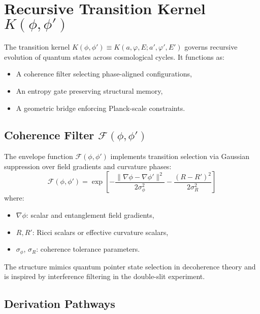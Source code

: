 \section{Recursive Transition Kernel \( K(\phi,\phi') \)}
\label{sec:kernel}

The transition kernel \( K(\phi,\phi') \equiv K(a,\varphi,E; a',\varphi',E') \) governs recursive evolution of quantum states across cosmological cycles. It functions as:
\begin{itemize}
    \item A coherence filter selecting phase-aligned configurations,
    \item An entropy gate preserving structural memory,
    \item A geometric bridge enforcing Planck-scale constraints.
\end{itemize}

\subsection{Coherence Filter \(\mathcal{F}(\phi,\phi')\)}
\label{subsec:coherence}

The envelope function \(\mathcal{F}(\phi,\phi')\) implements transition selection via Gaussian suppression over field gradients and curvature phases:
\begin{equation}
\mathcal{F}(\phi, \phi') = \exp\left[
    -\frac{\|\nabla\phi - \nabla\phi'\|^2}{2\sigma_\phi^2} 
    - \frac{(R - R')^2}{2\sigma_R^2}
\right]
\end{equation}
where:
\begin{itemize}
    \item \(\nabla \phi\): scalar and entanglement field gradients,
    \item \(R, R'\): Ricci scalars or effective curvature scalars,
    \item \(\sigma_\phi\), \(\sigma_R\): coherence tolerance parameters.
\end{itemize}
The structure mimics quantum pointer state selection in decoherence theory and is inspired by interference filtering in the double-slit experiment.

\subsection{Derivation Pathways}
\label{subsec:derivation}

